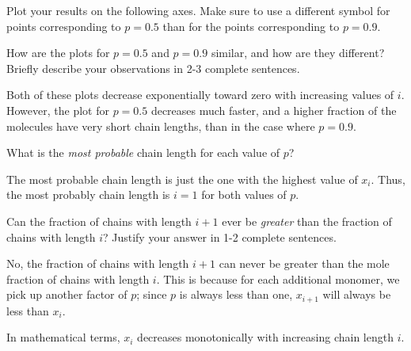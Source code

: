\begin{activity}
\begin{ctqs}
		\clearpage
	\question Plot your results on the following axes.  Make sure to use a different symbol for points corresponding to $p=0.5$ than for the points corresponding to $p=0.9$.
	
		\begin{solution}[2.75in]
		\end{solution}
	
	\question How are the plots for $p=0.5$ and $p=0.9$ similar, and how are they different?  Briefly describe your observations in 2-3 complete sentences.
	
		\begin{solution}[1.5in]
		
			Both of these plots decrease exponentially toward zero with increasing values of $i$.  However, the plot for $p=0.5$ decreases much faster, and a higher fraction of the molecules have very short chain lengths, than in the case where $p=0.9$.
		\end{solution}
	
	\question What is the \emph{most probable} chain length for each value of $p$?
	
		\begin{solution}[0.5in]
		
			The most probable chain length is just the one with the highest value of $x_i$.  Thus, the most probably chain length is $i=1$ for both values of $p$.
		
		\end{solution}
	
	\question Can the fraction of chains with length $i+1$ ever be \emph{greater} than the fraction of chains with length $i$?  Justify your answer in 1-2 complete sentences.
	
		\begin{solution}[1.5in]
		
			No, the fraction of chains with length $i+1$ can never be greater than the mole fraction of chains with length $i$.  This is because for each additional monomer, we pick up another factor of $p$; since $p$ is always less than one, $x_{i+1}$ will always be less than $x_i$.
			
			In mathematical terms, $x_i$ decreases monotonically with increasing chain length $i$.
		
		\end{solution}
	

\end{ctqs}
\end{activity}
